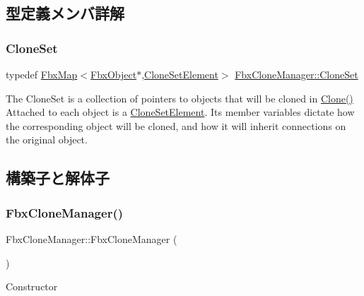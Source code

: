 \subsection{型定義メンバ詳解}
\mbox{\label{class_fbx_clone_manager_aeb8a9c04c9c36eb7e551186a0b18f10d}} 
\subsubsection{\texorpdfstring{Clone\+Set}{CloneSet}}
{\footnotesize\ttfamily typedef \hyperlink{class_fbx_map}{Fbx\+Map}$<$\hyperlink{class_fbx_object}{Fbx\+Object}$\ast$,\hyperlink{struct_fbx_clone_manager_1_1_clone_set_element}{Clone\+Set\+Element}$>$ \hyperlink{class_fbx_clone_manager_aeb8a9c04c9c36eb7e551186a0b18f10d}{Fbx\+Clone\+Manager\+::\+Clone\+Set}}

The Clone\+Set is a collection of pointers to objects that will be cloned in \hyperlink{class_fbx_clone_manager_a2fd72cbf71c6dd3105310445c1a7c2b1}{Clone()} Attached to each object is a \hyperlink{struct_fbx_clone_manager_1_1_clone_set_element}{Clone\+Set\+Element}. Its member variables dictate how the corresponding object will be cloned, and how it will inherit connections on the original object. 

\subsection{構築子と解体子}
\mbox{\label{class_fbx_clone_manager_a107bf53621e736a37d7a6ead38a4d899}} 
\subsubsection{\texorpdfstring{Fbx\+Clone\+Manager()}{FbxCloneManager()}}
{\footnotesize\ttfamily Fbx\+Clone\+Manager\+::\+Fbx\+Clone\+Manager (\begin{DoxyParamCaption}{ }\end{DoxyParamCaption})}

Constructor \mbox{\label{class_fbx_clone_manager_a8e2ff57b1e9d8ed1b8edb4274cf1c369}} 
